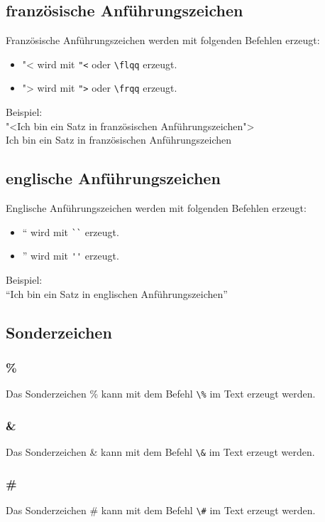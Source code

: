 \documentclass[
12pt,
ngerman
]{scrreprt}
\begin{document}
\subsection{französische Anführungszeichen}
\label{subsec:fr-qoute}
Französische Anführungszeichen werden mit folgenden Befehlen erzeugt: \\
\begin{itemize}
  \item "< wird mit \verb!"<! oder \verb!\flqq! erzeugt.
  \item "> wird mit \verb!">! oder \verb!\frqq! erzeugt.
\end{itemize}
Beispiel: \\
"<Ich bin ein Satz in französischen Anführungszeichen"> \\
\flqq Ich bin ein Satz in französischen Anführungszeichen\frqq

\subsection{englische Anführungszeichen}
\label{subsec:gb-qoute}
Englische Anführungszeichen werden mit folgenden Befehlen erzeugt: \\
\begin{itemize}
  \item `` wird mit \verb!``! erzeugt.
  \item '' wird mit \verb!''! erzeugt.
\end{itemize}
Beispiel: \\
``Ich bin ein Satz in englischen Anführungszeichen''

\subsection{Sonderzeichen}
\label{subsec:special-cases}

\subsubsection{\%}
Das Sonderzeichen \% kann mit dem Befehl \verb!\%! im Text erzeugt werden.

\subsubsection{\&}
Das Sonderzeichen \& kann mit dem Befehl \verb!\&! im Text erzeugt werden.

\subsubsection{\#}
Das Sonderzeichen \# kann mit dem Befehl \verb!\#! im Text erzeugt werden.
\end{document}
